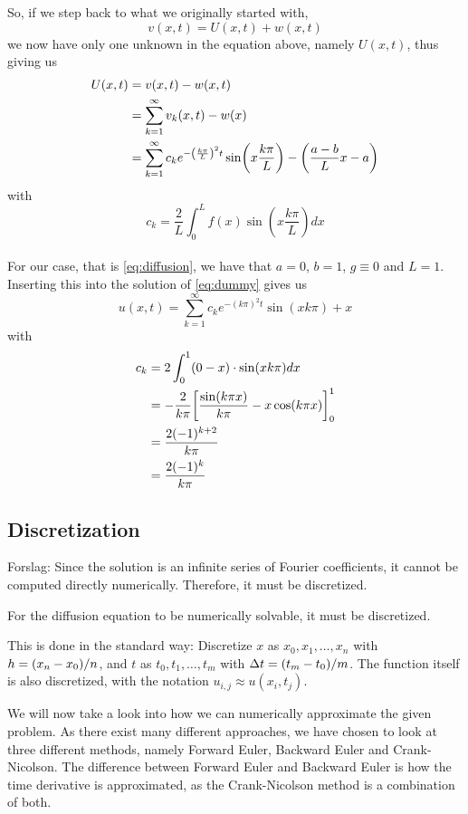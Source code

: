 \documentclass[12pt,english,a4paper]{article}
\begin{document}
So, if we step back to what we originally started with, 
\[
v(x,t) = U(x,t) + w(x,t)
\]
we now have only one unknown in the equation above, namely \(U(x,t)\), thus giving us
\begin{align*}
 U(x,t) &= v(x,t)- w(x,t) \\
 &=  \sum_{k=1}^\infty v_k(x,t) - w(x) \\
 &=\sum_{k=1}^\infty c_ke^{-\qty(\frac{k \pi}{L})^2t}\sin(x\frac{k \pi}{L})  -\qty(\frac{a-b}{L}x - a)
\end{align*}
with 
\[
c_k = \frac{2}{L}\int_0^Lf(x)\sin(x\frac{k \pi}{L})dx 
\]
\hfill \\
For our case, that is \vref{eq:diffusion}, we have that \(a = 0\), \(b = 1\), \(g \equiv 0\) and \(L = 1\). Inserting this into the solution of \vref{eq:dummy} gives us
\begin{equation}\label{eq:analyticalSolution}
	u(x,t) = \sum_{k=1}^\infty c_ke^{-(k\pi)^2t}\sin(xk\pi)  + x 
\end{equation}
with 
\begin{align*}
c_k &= 2\int_0^1(0-x)\cdot\sin(xk\pi)dx \\
&= - \frac{2}{k\pi}\qty[\frac{\sin(k\pi x)}{k\pi} - x\cos(k\pi x)]_0^1 \\
&= \frac{2(-1)^{k+2}}{k\pi} \\
&=  \frac{2(-1)^k}{k\pi} 
\end{align*}

\subsection{Discretization}

\begin{center}
	Forslag: \normal Since the solution is an infinite series of Fourier coefficients, it cannot be computed directly numerically. Therefore, it must be discretized. 
\end{center}

For the diffusion equation to be numerically solvable, it must be discretized. 

This is done in the standard way: Discretize \(x\) as \(x_0,x_1,\dots,x_n\) with \(h=\qty(x_n-x_0)/n\), and \(t\) as \(t_0,t_1,\dots,t_m\) with \(\Delta t = \qty(t_m-t_0)/m\). The function itself is also discretized, with the notation \(u_{i,j} \approx u(x_i,t_j)\). 

We will now take a look into how we can numerically approximate the given problem. As there exist many different approaches, we have chosen to look at three different methods, namely Forward Euler, Backward Euler and Crank-Nicolson. The difference between Forward Euler and Backward Euler is how the time derivative is approximated, as the Crank-Nicolson method is a combination of both. 
%
\end{document}
